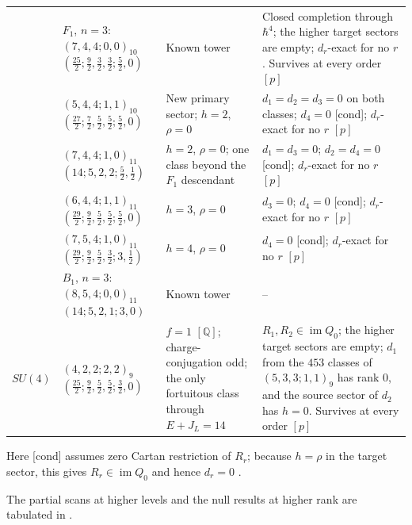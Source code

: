 \documentclass[11pt]{article}
\numberwithin{equation}{section}
\numberwithin{figure}{section}
\numberwithin{table}{section}
\begin{document}
{\begin{xltabular}{\linewidth}{|l|>{\raggedright\arraybackslash}p{3.55cm}|>{\raggedright\arraybackslash}X|>{\raggedright\arraybackslash}X|}
 & $F_1$, $n=3$: $(7,4,4;0,0)_{10}$\newline $(\tfrac{25}2;\tfrac92,\tfrac32,\tfrac32;\tfrac52,0)$ & Known tower \cite{KLLS,BraneFused} & Closed completion through $\hbar^4$; the higher target sectors are empty; $d_r$-exact for no $r$. Survives at every order $[p]$\\
 & $(5,4,4;1,1)_{10}$\newline $(\tfrac{27}2;\tfrac72,\tfrac52,\tfrac52;\tfrac52,0)$ & New primary sector; $h=2$, $\rho=0$ & $d_1=d_2=d_3=0$ on both classes; $d_4=0$ [cond]; $d_r$-exact for no $r$ $[p]$\\
 & $(7,4,4;1,0)_{11}$\newline $(14;5,2,2;\tfrac52,\tfrac12)$ & $h=2$, $\rho=0$; one class beyond the $F_1$ descendant & $d_1=d_3=0$; $d_2=d_4=0$ [cond]; $d_r$-exact for no $r$ $[p]$\\
 & $(6,4,4;1,1)_{11}$\newline $(\tfrac{29}2;\tfrac92,\tfrac52,\tfrac52;\tfrac52,0)$ & $h=3$, $\rho=0$ & $d_3=0$; $d_4=0$ [cond]; $d_r$-exact for no $r$ $[p]$\\
 & $(7,5,4;1,0)_{11}$\newline $(\tfrac{29}2;\tfrac92,\tfrac52,\tfrac32;3,\tfrac12)$ & $h=4$, $\rho=0$ & $d_4=0$ [cond]; $d_r$-exact for no $r$ $[p]$\\
 & $B_1$, $n=3$: $(8,5,4;0,0)_{11}$\newline $(14;5,2,1;3,0)$ & Known tower \cite{KLLS,BraneFused} & --\\
\hline
$SU(4)$ & $(4,2,2;2,2)_9$\newline $(\tfrac{25}2;\tfrac92,\tfrac52,\tfrac52;\tfrac32,0)$ & $f=1$ $[\mathbb Q]$; charge-conjugation odd; the only fortuitous class through $E+J_L=14$ & $R_1,R_2\in\operatorname{im}Q_0$; the higher target sectors are empty; $d_1$ from the $453$ classes of $(5,3,3;1,1)_9$ has rank $0$, and the source sector of $d_2$ has $h=0$. Survives at every order $[p]$\\
\hline
\end{xltabular}}

Here [cond] assumes zero Cartan restriction of $R_r$; because $h=\rho$ in the target sector, this gives $R_r\in\operatorname{im}Q_0$ and hence $d_r=0$ \cite[results report, \S1.6]{Repo}.

The partial scans at higher levels and the null results at higher rank are tabulated in \cite[supplement, Section S2.1]{Repo}.
\end{document}
